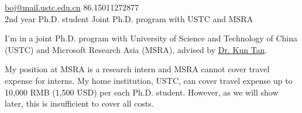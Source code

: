 \documentclass[10pt,a4paper]{article}
\begin{document}
\sloppy  %



\nobreakvspace{0.3em}  %

\noindent\href{mailto:boj@mail.ustc.edu.cn}{boj\mbox{}@\mbox{}mail.ustc.edu.cn}\sbull
\textsmaller{+}86.15011272877
\\
\noindent 2nd year Ph.D. student\sbull
Joint Ph.D. program with USTC and MSRA


\spacedhrule{0.8em}{-0.8em}  %



\spacedhrule{1.0em}{-0.8em}  %



\spacedhrule{1.0em}{-0.8em}  %


I'm in a joint Ph.D. program with University of Science and Technology of China (USTC) and Microsoft Research Asia (MSRA), advised by  \href{http://research.microsoft.com/en-us/people/kuntan/}{Dr. Kun Tan}.

My position at MSRA is a research intern and MSRA cannot cover travel expense for interns. My home institution, USTC, can cover travel expense up to 10,000 RMB (1,500 USD) per each Ph.D. student. However, as we will show later, this is insufficient to cover all costs.
\end{document}
